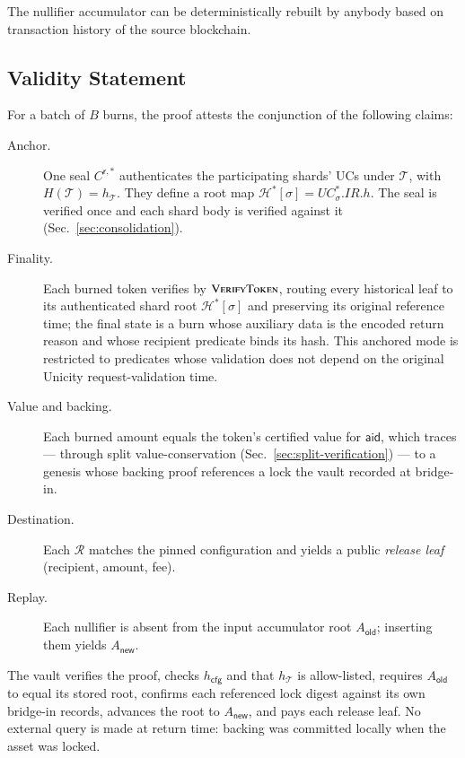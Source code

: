 The nullifier accumulator can be deterministically rebuilt by anybody based on transaction history of the source blockchain.

\subsection{Validity Statement}\label{sec:bridge-statement}

For a batch of $B$ burns, the proof attests the conjunction of the following claims:

\begin{description}
\item[Anchor.] One seal $C^{\mathsf r,*}$ authenticates the participating shards' UCs under $\mathcal T$, with $H(\mathcal T)=h_\mathcal T$. They define a root map $\mathcal H^*[\sigma]=UC^*_\sigma.IR.h$. The seal is verified once and each shard body is verified against it (Sec.~\ref{sec:consolidation}).
\item[Finality.] Each burned token verifies by $\Call{VerifyToken}{}$, routing every historical leaf to its authenticated shard root $\mathcal H^*[\sigma]$ and preserving its original reference time; the final state is a burn whose auxiliary data is the encoded return reason and whose recipient predicate binds its hash. This anchored mode is restricted to predicates whose validation does not depend on the original Unicity request-validation time.
\item[Value and backing.] Each burned amount equals the token's certified value for $\mathsf{aid}$, which traces --- through split value-conservation (Sec.~\ref{sec:split-verification}) --- to a genesis whose backing proof references a lock the vault recorded at bridge-in.
\item[Destination.] Each $\mathcal{R}$ matches the pinned configuration and yields a public \emph{release leaf} (recipient, amount, fee).
\item[Replay.] Each nullifier is absent from the input accumulator root $A_\mathsf{old}$; inserting them yields $A_\mathsf{new}$.
\end{description}

The vault verifies the proof, checks $h_\mathsf{cfg}$ and that $h_\mathcal{T}$ is allow-listed, requires $A_\mathsf{old}$ to equal its stored root, confirms each referenced lock digest against its own bridge-in records, advances the root to $A_\mathsf{new}$, and pays each release leaf. No external query is made at return time: backing was committed locally when the asset was locked.

